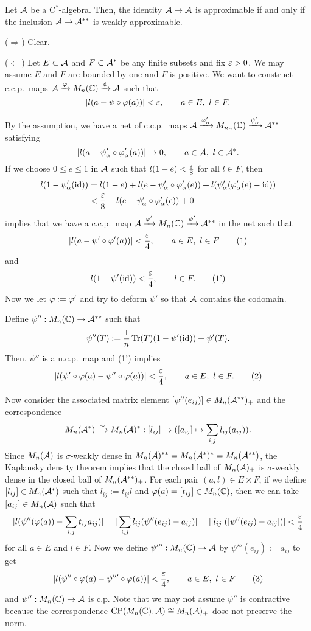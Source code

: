 \documentclass{../../small}
\begin{document}
\begin{thm}
Let $\mathcal{A}$ be a C$^*$-algebra.
Then, the identity $\mathcal{A}\to\mathcal{A}$ is approximable if and only if the inclusion $\mathcal{A}\to\mathcal{A}^{**}$ is weakly approximable.
\end{thm}
\begin{pf}
($\Rightarrow$)
Clear.

($\Leftarrow$)
Let $E\subset\mathcal{A}$ and $F\subset\mathcal{A}^*$ be any finite subsets and fix $\varepsilon>0$.
We may assume $E$ and $F$ are bounded by one and $F$ is positive.
We want to construct c.c.p.~maps $\mathcal{A}\xrightarrow{\varphi}M_n(\mathbb{C})\xrightarrow{\psi}\mathcal{A}$ such that
\[|l(a-\psi\circ\varphi(a))|<\varepsilon,\qquad a\in E,\ l\in F.\]

By the assumption, we have a net of c.c.p.~maps $\mathcal{A}\xrightarrow{\varphi'_\alpha}M_{n_\alpha}(\mathbb{C})\xrightarrow{\psi'_\alpha}\mathcal{A}^{**}$ satisfying
\[|l(a-\psi'_\alpha\circ\varphi'_\alpha(a))|\to0,\qquad a\in\mathcal{A},\ l\in\mathcal{A}^*.\]
If we choose $0\le e\le1$ in $\mathcal{A}$ such that $l(1-e)<\frac{\varepsilon}8$ for all $l\in F$, then
\begin{align*}
l(1-\psi'_\alpha(\operatorname{id}))
&=l(1-e)+l(e-\psi'_\alpha\circ\varphi'_\alpha(e))+l(\psi'_\alpha(\varphi'_\alpha(e)-\operatorname{id}))\\
&<\frac{\varepsilon}8+l(e-\psi'_\alpha\circ\varphi'_\alpha(e))+0
\end{align*}
implies that we have a c.c.p.~map $\mathcal{A}\xrightarrow{\varphi'}M_n(\mathbb{C})\xrightarrow{\psi'}\mathcal{A}^{**}$ in the net such that
\[|l(a-\psi'\circ\varphi'(a))|<\frac{\varepsilon}4,\qquad a\in E,\ l\in F\tag{1}\]
and
\[l(1-\psi'(\operatorname{id}))<\frac{\varepsilon}4,\qquad l\in F.\tag{1'}\]
Now we let $\varphi:=\varphi'$ and try to deform $\psi'$ so that $\mathcal{A}$ contains the codomain.

Define $\psi'':M_n(\mathbb{C})\to\mathcal{A}^{**}$ such that
\[\psi''(T):=\frac1n\operatorname{Tr}(T)(1-\psi'(\operatorname{id}))+\psi'(T).\]
Then, $\psi''$ is a u.c.p.~map and (1') implies
\[|l(\psi'\circ\varphi(a)-\psi''\circ\varphi(a))|<\frac{\varepsilon}4,\qquad a\in E,\ l\in F.\tag{2}\]

Now consider the associated matrix element $[\psi''(e_{ij})]\in M_n(\mathcal{A}^{**})_+$ and the correspondence
\[M_n(\mathcal{A}^*)\xrightarrow{\sim}M_n(\mathcal{A})^*:[l_{ij}]\mapsto([a_{ij}]\mapsto\sum_{i,j}l_{ij}(a_{ij})).\]
Since $M_n(\mathcal{A})$ is $\sigma$-weakly dense in $M_n(\mathcal{A})^{**}=M_n(\mathcal{A}^*)^*=M_n(\mathcal{A}^{**})$, the Kaplansky density theorem implies that the closed ball of $M_n(\mathcal{A})_+$ is $\sigma$-weakly dense in the closed ball of $M_n(\mathcal{A}^{**})_+$.
For each pair $(a,l)\in E\times F$, if we define $[l_{ij}]\in M_n(\mathcal{A}^*)$ such that $l_{ij}:=t_{ij}l$ and $\varphi(a)=[t_{ij}]\in M_n(\mathbb{C})$, then we can take $[a_{ij}]\in M_n(\mathcal{A})$ such that
\[|l(\psi''(\varphi(a))-\sum_{i,j}t_{ij}a_{ij})|=|\sum_{i,j}l_{ij}(\psi''(e_{ij})-a_{ij})|=|[l_{ij}]([\psi''(e_{ij})-a_{ij}])|<\frac{\varepsilon}4\]
for all $a\in E$ and $l\in F$.
Now we define $\psi''':M_n(\mathbb{C})\to\mathcal{A}$ by $\psi'''(e_{ij}):=a_{ij}$ to get
\[|l(\psi''\circ\varphi(a)-\psi'''\circ\varphi(a))|<\frac{\varepsilon}4,\qquad a\in E,\ l\in F\tag{3}\]
and $\psi'':M_n(\mathbb{C})\to\mathcal{A}$ is c.p.
Note that we may not assume $\psi''$ is contractive because the correspondence $\mathrm{CP}(M_n(\mathbb{C}),\mathcal{A})\cong M_n(\mathcal{A})_+$ dose not preserve the norm.


\end{pf}
\end{document}
